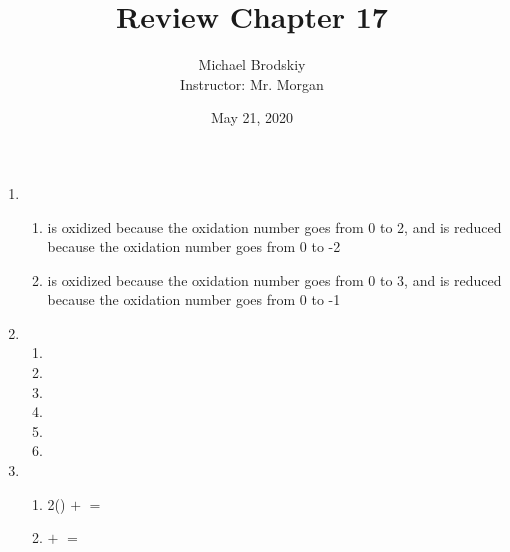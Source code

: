 \documentclass[12pt]{article}
\title{Review Chapter 17}
\date{May 21, 2020}
\author{Michael Brodskiy\\ \small Instructor: Mr. Morgan}
\begin{document}
\maketitle

\begin{enumerate}

  \item

    \begin{enumerate}

      \item {} is oxidized because the oxidation number goes from 0 to 2, and  is reduced because the oxidation number goes from 0 to -2

      \item {} is oxidized because the oxidation number goes from 0 to 3, and  is reduced because the oxidation number goes from 0 to -1

    \end{enumerate}

  \item

    \begin{enumerate}

      \item {}

      \item {}

      \item {}

      \item {}

      \item {}

      \item {}

    \end{enumerate}

  \item 

    \begin{enumerate}

      \item 2() $+$  $=$\\ 

      \item {} $+$  $=$ 


\end{enumerate}
\end{enumerate}
\end{document}
